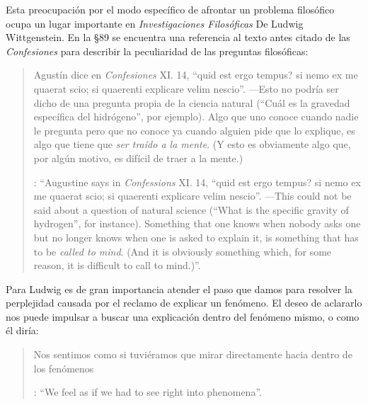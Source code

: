 Esta preocupación por el modo específico de afrontar un problema filosófico ocupa un lugar importante en \emph{Investigaciones Filosóficas} De Ludwig Wittgenstein. En la \S89 se encuentra una referencia al texto antes citado de las \emph{Confesiones} para describir la peculiaridad de las preguntas filosóficas: \blockquote[{\Cite[\S89]{wittgenstein1953phiinv}}: \enquote{Augustine says in \emph{Confessions} XI. 14, ``quid est ergo tempus? si nemo ex me quaerat scio; si quaerenti explicare velim nescio''. ---This could not be said about a question of natural science (``What is the specific gravity of hydrogen'', for instance). Something that one knows when nobody asks one but no longer knows when one is asked to explain it, is something that has to be \emph{called to mind}. (And it is obviously something which, for some reason, it is difficult to call to mind.)}.]{Agustín dice en \emph{Confesiones} XI. 14, ``quid est ergo tempus? si nemo ex me quaerat scio; si quaerenti explicare velim nescio''. ---Esto no podría ser dicho de una pregunta propia de la ciencia natural (``Cuál es la gravedad específica del hidrógeno'', por ejemplo). Algo que uno conoce cuando nadie le pregunta pero que no conoce ya cuando alguien pide que lo explique, es algo que tiene que \emph{ser traído a la mente}. (Y esto es obviamente algo que, por algún motivo, es difícil de traer a la mente.)} Para Ludwig es de gran importancia atender el paso que damos para resolver la perplejidad causada por el reclamo de explicar un fenómeno. El deseo de aclararlo nos puede impulsar a buscar una explicación dentro del fenómeno mismo, o como él diría: \blockquote[{\Cite[\S90]{wittgenstein1953phiinv}}: \enquote{We feel as if we had to see right into phenomena}.]{Nos sentimos como si tuviéramos que mirar directamente hacia dentro de los fenómenos}.


